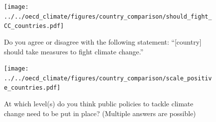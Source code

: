 \begin{framefont}{\small}

\begin{frame}{} %
	\begin{figure}[h!]
	\centering
	\caption{Do you agree or disagree with the following statement: ``[country] should take measures to fight climate change.'' \hyperlink{global_policies}{}
	}
	\texttt{[image: ../../oecd\_climate/figures/country\_comparison/should\_fight\_CC\_countries.pdf]}
	\end{figure}
\end{frame}

\begin{frame}{}%
	\begin{figure}[h!]
	\centering
	\caption{
		At which level(s) do you think public policies to tackle climate change need to be put in place? (Multiple answers are possible) \hyperlink{global_policies}{}
	}
	\texttt{[image: ../../oecd\_climate/figures/country\_comparison/scale\_positive\_countries.pdf]}
	\end{figure}
\end{frame}


\end{framefont}
